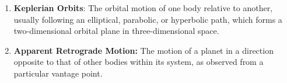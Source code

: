 \documentclass[12pt]{article}
\begin{document}
\begin{spacing}{1.25}
{\begin{enumerate}
        \item \label{app:keplerian_orbits} \textbf{Keplerian Orbits}: The orbital motion of one body relative to another, usually following an elliptical, parabolic, or hyperbolic path, which forms a two-dimensional orbital plane in three-dimensional space.

        \item \label{app:apparent_retrograde_motion} \textbf{Apparent Retrograde Motion:} The motion of a planet in a direction opposite to that of other bodies within its system, as observed from a particular vantage point.
    \end{enumerate}
}

\end{spacing}
\end{document}
